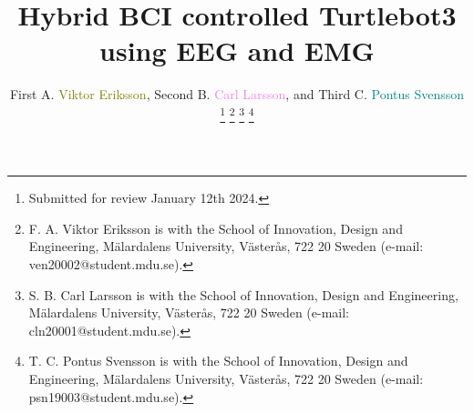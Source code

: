 \documentclass[9pt,shortpaper,twoside,web]{ieeecolor}
\begin{document}
\title{Hybrid BCI controlled Turtlebot3 using EEG and EMG}

\author{{First A. \textcolor{olive}{Viktor Eriksson}, Second B. \textcolor{violet}{Carl Larsson}, and Third C. \textcolor{teal}{Pontus Svensson}}
	\thanks{Submitted for review January 12th 2024.}
	\thanks{F. A. Viktor Eriksson is with the School of Innovation, Design and Engineering, Mälardalens University, Västerås, 722 20 Sweden (e-mail: ven20002@student.mdu.se). }
	\thanks{S. B. Carl Larsson is with the School of Innovation, Design and Engineering, Mälardalens University, Västerås, 722 20 Sweden (e-mail: cln20001@student.mdu.se). }
	\thanks{T. C. Pontus Svensson is with the School of Innovation, Design and Engineering, Mälardalens University, Västerås, 722 20 Sweden (e-mail: psn19003@student.mdu.se).}}

\maketitle








%
%




\end{document}
